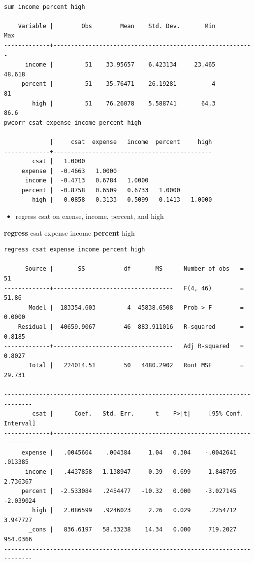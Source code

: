 \documentclass[
]{book}
\newenvironment{Shaded}{\begin{snugshade}}{\end{snugshade}}
\newcommand{\KeywordTok}[1]{\textcolor[rgb]{0.13,0.29,0.53}{\textbf{#1}}}
\newcommand{\NormalTok}[1]{#1}
\providecommand{\tightlist}{%
  \setlength{\itemsep}{0pt}\setlength{\parskip}{0pt}}
\begin{document}
\begin{verbatim}

sum income percent high

    Variable |        Obs        Mean    Std. Dev.       Min        Max
-------------+---------------------------------------------------------
      income |         51    33.95657    6.423134     23.465     48.618
     percent |         51    35.76471    26.19281          4         81
        high |         51    76.26078    5.588741       64.3       86.6
pwcorr csat expense income percent high

             |     csat  expense   income  percent     high
-------------+---------------------------------------------
        csat |   1.0000 
     expense |  -0.4663   1.0000 
      income |  -0.4713   0.6784   1.0000 
     percent |  -0.8758   0.6509   0.6733   1.0000 
        high |   0.0858   0.3133   0.5099   0.1413   1.0000
\end{verbatim}

\begin{itemize}
\tightlist
\item
  regress csat on exense, income, percent, and high
\end{itemize}

\begin{Shaded}
\begin{Highlighting}[]
  \KeywordTok{regress}\NormalTok{ csat expense income }\KeywordTok{percent}\NormalTok{ high}
\end{Highlighting}
\end{Shaded}

\begin{verbatim}
regress csat expense income percent high

      Source |       SS           df       MS      Number of obs   =        51
-------------+----------------------------------   F(4, 46)        =     51.86
       Model |  183354.603         4  45838.6508   Prob > F        =    0.0000
    Residual |  40659.9067        46  883.911016   R-squared       =    0.8185
-------------+----------------------------------   Adj R-squared   =    0.8027
       Total |   224014.51        50   4480.2902   Root MSE        =    29.731

------------------------------------------------------------------------------
        csat |      Coef.   Std. Err.      t    P>|t|     [95% Conf. Interval]
-------------+----------------------------------------------------------------
     expense |   .0045604    .004384     1.04   0.304    -.0042641     .013385
      income |   .4437858   1.138947     0.39   0.699    -1.848795    2.736367
     percent |  -2.533084   .2454477   -10.32   0.000    -3.027145   -2.039024
        high |   2.086599   .9246023     2.26   0.029     .2254712    3.947727
       _cons |   836.6197   58.33238    14.34   0.000     719.2027    954.0366
------------------------------------------------------------------------------
\end{verbatim}
\end{document}
